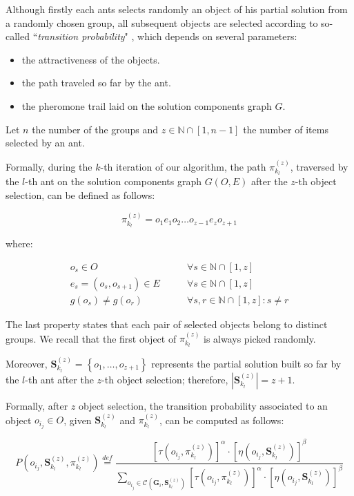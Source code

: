\documentclass[12pt,a4paper]{report}
\newcommand{\mathDef}{\overset{\textit{def}}{=}}
\newcommand{\N}{\mathbb{N}}
\newcommand{\SetFromOneTo}[1]{\N \cap \left[1,#1\right]}
\newcommand{\ItalicQuotMark}[1]{``\textit{#1}"}
\begin{document}
Although firstly each ants selects randomly an object of his partial solution from a randomly chosen group, all subsequent objects are selected according to so-called \ItalicQuotMark{transition probability} \cite{MAXMIN}\cite{acosemplice}\cite{acostrano}, which depends on several parameters:

\begin{itemize}
	\item the attractiveness of the objects.
	\item the path traveled so far by the ant.
	\item the pheromone trail laid on the solution components graph $G$.
\end{itemize}

Let $n$ the number of the groups and $z \in \SetFromOneTo{n-1}$ the number of items selected by an ant. 

Formally, during the $k$-th iteration of our algorithm, the path $\pi_{k_l}^{(z)}$, traversed by the $l$-th ant on the solution components graph $G(O,E)$ after the $z$-th object selection, can be defined as follows:

\begin{equation}
	\pi_{k_l}^{(z)} = o_1e_1o_2 \ldots o_{z-1}e_{z}o_{z+1}
\end{equation} 

where:

\begin{eqnarray}
	o_s \in O & \qquad \forall s \in \SetFromOneTo{z} \\
	e_s = (o_s,o_{s+1}) \in E  & \qquad \forall s \in \SetFromOneTo{z} \\
	g(o_s) \neq g(o_r)   &\qquad \forall s,r \in \SetFromOneTo{z} : s \neq r
\end{eqnarray}

The last property states that each pair of selected objects belong to distinct groups. We recall that the first object of $\pi_{k_l}^{(z)}$ is always picked randomly.

Moreover, $\textbf{S}_{k_l}^{(z)} = \left\{o_1,\ldots,o_{z+1}\right\}$ represents the partial solution built so far by the $l$-th ant after the $z$-th object selection; therefore, $|\textbf{S}_{k_l}^{(z)}| = z + 1$.  

Formally, after $z$ object selection, the transition probability associated to an object $o_{i_j} \in O$, given $\textbf{S}_{k_l}^{(z)}$ and $\pi_{k_l}^{(z)}$, can be computed as follows:




\begin{equation}
	P(o_{i_j}, \textbf{S}_{k_l}^{(z)}, \pi_{k_l}^{(z)}) \mathDef \frac{\left[ \tau( o_{i_j}, \pi_{k_l}^{(z)}) \right]^{\alpha} \cdot \left[ \eta( o_{i_j}, \textbf{S}_{k_l}^{(z)}) \right]^{\beta}}{\displaystyle \sum_{o_{i_j} \in \mathcal{C}(\textbf{G}_i, \textbf{S}_{k_l}^{(z)})} \left[ \tau( o_{i_j}, \pi_{k_l}^{(z)}) \right]^{\alpha} \cdot \left[ \eta( o_{i_j}, \textbf{S}_{k_l}^{(z)}) \right]^{\beta}}
\end{equation}
\end{document}
